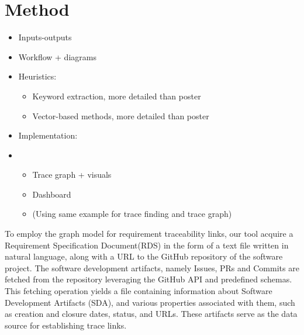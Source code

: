 \documentclass[conference]{IEEEtran}
\begin{document}

\section{Method}
\label{section:method}
\begin{itemize}
    \item Inputs-outputs
    \item Workflow + diagrams
    \item Heuristics:
    \begin{itemize}
        \item Keyword extraction, more detailed than poster
        \item Vector-based methods, more detailed than poster
    \end{itemize}
    \item Implementation:
    \item \begin{itemize}
        \item Trace graph + visuals
        \item Dashboard
        \item (Using same example for trace finding and trace graph)
    \end{itemize}
\end{itemize}

To employ the graph model for requirement traceability links, our tool acquire a Requirement Specification Document(RDS) in the form of a text file written in natural language, along with a URL to the GitHub repository of the software project. The software development artifacts, namely Issues, PRs and Commits are fetched from the repository leveraging the GitHub API and predefined schemas. This fetching operation yields a file containing information about Software Development Artifacts (SDA), and various properties associated with them, such as creation and closure dates, status, and URLs. These artifacts serve as the data source for establishing trace links.
\end{document}
